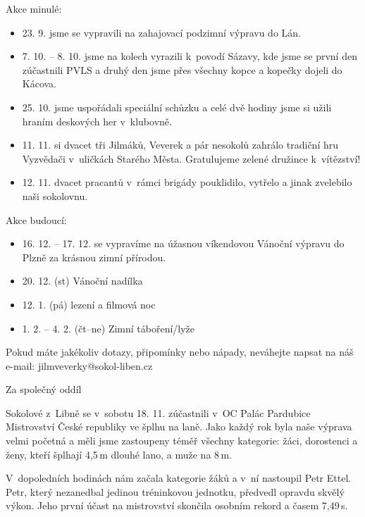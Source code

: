 \documentclass[11pt]{article}
\begin{document}
\vspace*{12pt}\noindent
Akce minulé:
\begin{itemize}[
  itemsep=-3pt,
  leftmargin=2em,
  itemindent=-1em
]
  \item[] 23. 9. jsme se vypravili na zahajovací podzimní výpravu do Lán.
  \item[] 7. 10. – 8. 10. jsme na kolech vyrazili k~povodí Sázavy, kde jsme se první den zúčastnili PVLS a druhý den jsme přes všechny kopce a kopečky dojeli do Kácova.
  \item[] 25. 10. jsme uspořádali speciální schůzku a celé dvě hodiny jsme si užili hraním deskových her v~klubovně.
  \item[] 11. 11. si dvacet tři Jilmáků, Veverek a pár nesokolů zahrálo tradiční hru Vyzvědači v~uličkách Starého Města. Gratulujeme zelené družince k~vítězství! 
  \item[] 12. 11. dvacet pracantů v~rámci brigády pouklidilo, vytřelo a jinak zvelebilo naši sokolovnu.
\end{itemize}
\vspace*{6pt}
\noindent
Akce budoucí:
\begin{itemize}[
  itemsep=-3pt,
  leftmargin=2em,
  itemindent=-1em
]
  \item[] 16. 12. – 17. 12. se vypravíme na úžasnou víkendovou Vánoční výpravu do Plzně za krásnou zimní přírodou.
  \item[] 20. 12. (st) Vánoční nadílka
  \item[] 12. 1. (pá) lezení a filmová noc
  \item[] 1. 2. – 4. 2.  (čt–ne) Zimní táboření/lyže 
\end{itemize}

\noindent
Pokud máte jakékoliv dotazy, připomínky nebo nápady, neváhejte napsat na náš e-mail: jilmveverky@sokol-liben.cz

Za společný oddíl
 
\signature{Bára Jeníková}{}

\vspace*{24pt}

Sokolové z~Libně se v~sobotu 18. 11. zúčastnili v~OC Palác Pardubice Mistrovství České republiky ve šplhu na laně. Jako každý rok byla naše výprava velmi početná a měli jsme zastoupeny téměř všechny kategorie: žáci, dorostenci a ženy, kteří šplhají 4,5\,m dlouhé lano, a muže na 8\,m.

V~dopoledních hodinách nám začala kategorie žáků a v~ní nastoupil Petr Ettel. Petr, který nezanedbal jedinou tréninkovou jednotku, předvedl opravdu skvělý výkon. Jeho první účast na mistrovství skončila osobním rekord a časem 7,49\,s.
\end{document}
